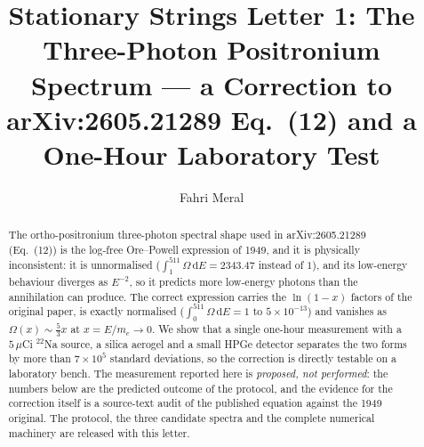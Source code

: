 \documentclass[twocolumn]{svjour3}
\begin{document}
\title{Stationary Strings Letter 1: The Three-Photon Positronium Spectrum ---
a Correction to arXiv:2605.21289 Eq.~(12) and a One-Hour Laboratory Test}

\author{Fahri Meral}


\begin{abstract}
The ortho-positronium three-photon spectral shape used in
arXiv:2605.21289 (Eq.~(12)) is the log-free Ore--Powell expression of
1949, and it is physically inconsistent: it is unnormalised
($\int_1^{511}\allowbreak\Omega\,\mathrm{d}E = 2343.47$ instead of $1$), and its
low-energy behaviour diverges as $E^{-2}$, so it predicts more
low-energy photons than the annihilation can produce. The correct
expression carries the $\ln(1-x)$ factors of the original paper,
is exactly normalised ($\int_0^{511}\allowbreak\Omega\,\mathrm{d}E = 1$ to
$5\times 10^{-13}$) and vanishes as $\Omega(x)\sim\tfrac{5}{3}x$ at
$x=E/m_e\to 0$. We show that a single one-hour measurement with a
$5\,\mu$Ci $^{22}$Na source, a silica aerogel and a small HPGe
detector separates the two forms by more than $7\times 10^{5}$
standard deviations, so the correction is directly testable on a
laboratory bench. The measurement reported here is \emph{proposed, not
performed}: the numbers below are the predicted outcome of the
protocol, and the evidence for the correction itself is a source-text
audit of the published equation against the 1949 original. The
protocol, the three candidate spectra and the complete numerical
machinery are released with this letter.
\end{abstract}


\maketitle
\end{document}
